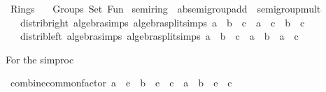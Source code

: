 %
\begin{isabellebody}%
%
%
\isadelimdocument
%
\endisadelimdocument
%
\isatagdocument
%
\isamarkuptrue%
%
\endisatagdocument
{\isafolddocument}%
%
\isadelimdocument
%
\endisadelimdocument
%
\isadelimtheory
%
\endisadelimtheory
%
\isatagtheory
{}\isamarkupfalse%
\ Rings\isanewline
\ \ \ Groups\ Set\ Fun\isanewline
{}%
\endisatagtheory
{\isafoldtheory}%
%
\isadelimtheory
%
\endisadelimtheory
%
\isadelimdocument
%
\endisadelimdocument
%
\isatagdocument
%
\isamarkuptrue%
%
\endisatagdocument
{\isafolddocument}%
%
\isadelimdocument
%
\endisadelimdocument
{}\isamarkupfalse%
\ semiring\ {\isacharequal}{\kern0pt}\ ab{\isacharunderscore}{\kern0pt}semigroup{\isacharunderscore}{\kern0pt}add\ {\isacharplus}{\kern0pt}\ semigroup{\isacharunderscore}{\kern0pt}mult\ {\isacharplus}{\kern0pt}\isanewline
\ \ \ distrib{\isacharunderscore}{\kern0pt}right\ {\isacharbrackleft}{\kern0pt}algebra{\isacharunderscore}{\kern0pt}simps{\isacharcomma}{\kern0pt}\ algebra{\isacharunderscore}{\kern0pt}split{\isacharunderscore}{\kern0pt}simps{\isacharbrackright}{\kern0pt}{\isacharcolon}{\kern0pt}\ {\isachardoublequoteopen}{\isacharparenleft}{\kern0pt}a\ {\isacharplus}{\kern0pt}\ b{\isacharparenright}{\kern0pt}\ {\isacharasterisk}{\kern0pt}\ c\ {\isacharequal}{\kern0pt}\ a\ {\isacharasterisk}{\kern0pt}\ c\ {\isacharplus}{\kern0pt}\ b\ {\isacharasterisk}{\kern0pt}\ c{\isachardoublequoteclose}\isanewline
\ \ \ distrib{\isacharunderscore}{\kern0pt}left\ {\isacharbrackleft}{\kern0pt}algebra{\isacharunderscore}{\kern0pt}simps{\isacharcomma}{\kern0pt}\ algebra{\isacharunderscore}{\kern0pt}split{\isacharunderscore}{\kern0pt}simps{\isacharbrackright}{\kern0pt}{\isacharcolon}{\kern0pt}\ {\isachardoublequoteopen}a\ {\isacharasterisk}{\kern0pt}\ {\isacharparenleft}{\kern0pt}b\ {\isacharplus}{\kern0pt}\ c{\isacharparenright}{\kern0pt}\ {\isacharequal}{\kern0pt}\ a\ {\isacharasterisk}{\kern0pt}\ b\ {\isacharplus}{\kern0pt}\ a\ {\isacharasterisk}{\kern0pt}\ c{\isachardoublequoteclose}\isanewline
{}%
\begin{isamarkuptext}%
For the  simproc%
\end{isamarkuptext}\isamarkuptrue%
\isamarkupfalse%
\ combine{\isacharunderscore}{\kern0pt}common{\isacharunderscore}{\kern0pt}factor{\isacharcolon}{\kern0pt}\ {\isachardoublequoteopen}a\ {\isacharasterisk}{\kern0pt}\ e\ {\isacharplus}{\kern0pt}\ {\isacharparenleft}{\kern0pt}b\ {\isacharasterisk}{\kern0pt}\ e\ {\isacharplus}{\kern0pt}\ c{\isacharparenright}{\kern0pt}\ {\isacharequal}{\kern0pt}\ {\isacharparenleft}{\kern0pt}a\ {\isacharplus}{\kern0pt}\ b{\isacharparenright}{\kern0pt}\ {\isacharasterisk}{\kern0pt}\ e\ {\isacharplus}{\kern0pt}\ c{\isachardoublequoteclose}\isanewline

\end{isabellebody}
